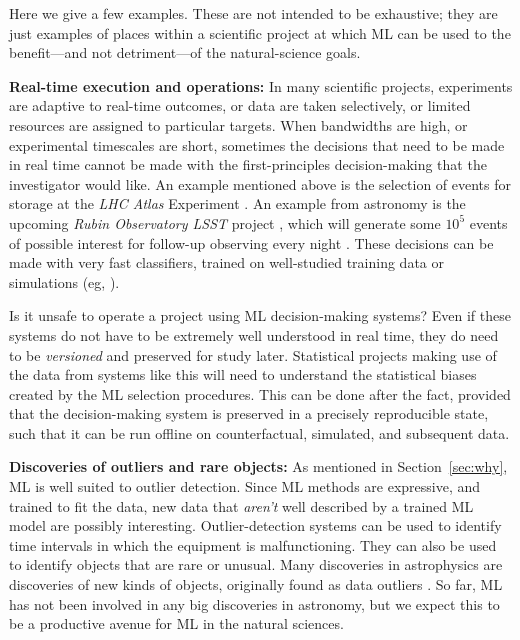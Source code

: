 \documentclass{article}
\renewcommand{\paragraph}[1]{\noindent\par\textbf{#1}}
\newcommand{\sectionname}{Section}
\newcommand{\secref}[1]{\sectionname~\ref{#1}}
\begin{document}
Here we give a few examples.
These are not intended to be exhaustive; they are just examples of places within a scientific project at which ML can be used to the benefit---and not detriment---of the natural-science goals.

\paragraph{Real-time execution and operations:}
In many scientific projects, experiments are adaptive to real-time outcomes, or data are taken selectively, or limited resources are assigned to particular targets.
When bandwidths are high, or experimental timescales are short, sometimes the decisions that need to be made in real time cannot be made with the first-principles decision-making that the investigator would like.
An example mentioned above is the selection of events for storage at the \textsl{LHC Atlas} Experiment \cite{atlas}.
An example from astronomy is the upcoming \textsl{Rubin Observatory LSST} project \cite{rubin}, which will generate some $10^5$ events of possible interest for follow-up observing every night \cite{lsst_events}.
These decisions can be made with very fast classifiers, trained on well-studied training data or simulations (eg, \citealt{lsst_broker}).

Is it unsafe to operate a project using ML decision-making systems?
Even if these systems do not have to be extremely well understood in real time, they do need to be \emph{versioned} and preserved for study later.
Statistical projects making use of the data from systems like this will need to understand the statistical biases created by the ML selection procedures.
This can be done after the fact, provided that the decision-making system is preserved in a precisely reproducible state, such that it can be run offline on counterfactual, simulated, and subsequent data.

\paragraph{Discoveries of outliers and rare objects:}
As mentioned in \secref{sec:why}, ML is well suited to outlier detection.
Since ML methods are expressive, and trained to fit the data, new data that \emph{aren't} well described by a trained ML model are possibly interesting.
Outlier-detection systems can be used to identify time intervals in which the equipment is malfunctioning.
They can also be used to identify objects that are rare or unusual.
Many discoveries in astrophysics are discoveries of new kinds of objects, originally found as data outliers \cite{quasars, voorwerp}.
So far, ML has not been involved in any big discoveries in astronomy, but we expect this to be a productive avenue for ML in the natural sciences.
\end{document}

